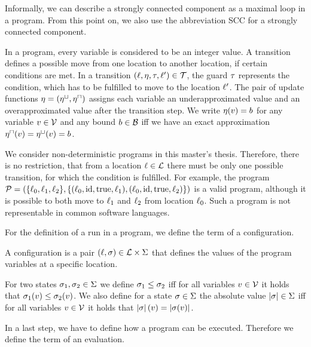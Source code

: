 Informally, we can describe a strongly connected component as a maximal loop in a program.
From this point on, we also use the abbreviation SCC for a strongly connected component.

In a program, every variable is considered to be an integer value.
A transition defines a possible move from one location to another location, if certain conditions are met.
In a transition $(\ell,\eta,\tau,\ell') \in \mathcal{T}$, the guard $\tau$ represents the condition, which has to be fulfilled to move to the location $\ell'$.
The pair of update functions $\eta = (\eta^\sqcup, \eta^\sqcap)$ assigns each variable an underapproximated value and an overapproximated value after the transition step.
We write $\eta(v) = b$ for any variable $v \in \mathcal{V}$ and any bound $b \in \mathcal{B}$ iff we have an exact approximation $\eta^\sqcap(v) = \eta^\sqcup(v) = b$.

We consider non-deterministic programs in this master's thesis.
Therefore, there is no restriction, that from a location $\ell \in \mathcal{L}$ there must be only one possible transition, for which the condition is fulfilled.
For example, the program $\mathcal{P} = (\lbrace \ell_0,\ell_1,\ell_2 \rbrace,\lbrace (\ell_0,\text{id},\text{true},\ell_1),(\ell_0,\text{id},\text{true},\ell_2) \rbrace)$ is a valid program, although it is possible to both move to $\ell_1$ and $\ell_2$ from location $\ell_0$.
Such a program is not representable in common software languages.

For the definition of a run in a program, we define the term of a configuration.

\begin{definition}[Configuration] 
  A configuration is a pair $(\ell, \sigma) \in \mathcal{L} \times \Sigma$ that defines the values of the program variables at a specific location.
\end{definition}

For two states $\sigma_1, \sigma_2 \in \Sigma$ we define $\sigma_1 \leq \sigma_2$ iff for all variables $v \in \mathcal{V}$ it holds that $\sigma_1(v) \leq \sigma_2(v)$.
We also define for a state $\sigma \in \Sigma$ the absolute value $\left|\sigma\right| \in \Sigma$ iff for all variables $v \in \mathcal{V}$ it holds that $\left|\sigma\right|(v) = \left|\sigma(v)\right|$.

In a last step, we have to define how a program can be executed.
Therefore we define the term of an evaluation.


